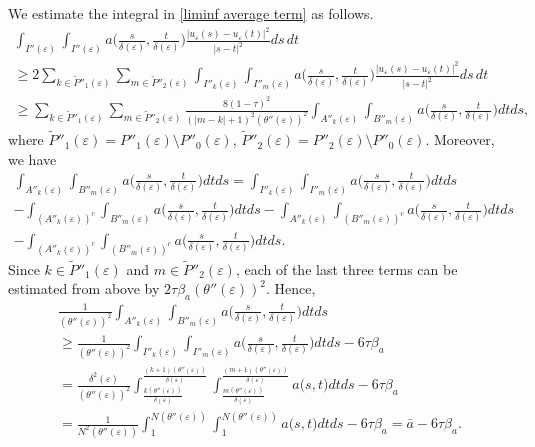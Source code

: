 \documentclass[12pt]{article}
\numberwithin{equation}{section}
\def\e{\varepsilon}
\begin{document}
 We estimate the integral in \eqref{liminf average term} as follows.
 \begin{multline*}    \int_{I''(\e)}\int_{I''(\e)}a\Big(\frac{s}{\delta(\e) },\frac{t}{\delta(\e) }\Big)\frac{\left|u_{\varepsilon}(s)-u_{\varepsilon}(t)\right|^2}{\left|s-t\right|^2}ds\,dt\\\ge2\sum_{k\in\widetilde{P}''_{1}(\varepsilon)}\sum_{m\in\widetilde{P}''_{2}(\varepsilon)}\int_{I''_{k}(\varepsilon)}\int_{I''_{m}(\varepsilon)}a\Big(\frac{s}{\delta(\e) },\frac{t}{\delta(\e) }\Big)\frac{\left|u_{\varepsilon}(s)-u_{\varepsilon}(t)\right|^2}{\left|s-t\right|^2}ds\,dt\\\ge\sum_{k\in\widetilde{P}''_{1}(\varepsilon)}\sum_{m\in\widetilde{P}''_{2}(\varepsilon)}\frac{8(1-\tau)^{2}}{(|m-k|+1)^{2}(\theta''(\e))^{2}}\int_{A''_{k}(\varepsilon)}\int_{B''_{m}(\varepsilon)}a\Big(\frac{s}{\delta(\varepsilon)},\frac{t}{\delta(\e)}\Big)dtds, 
 \end{multline*}
 where
$\widetilde{P}''_1(\varepsilon)=P''_{1}(\varepsilon)\setminus P''_{0}(\varepsilon)$, $\widetilde{P}''_{2}(\varepsilon)=P''_{2}(\varepsilon)\setminus P''_{0}(\varepsilon)$. Moreover, we have
\begin{multline*}
    \int_{A''_{k}(\varepsilon)}\int_{B''_{m}(\varepsilon)}a\Big(\frac{s}{\delta(\varepsilon)},\frac{t}{\delta(\varepsilon)}\Big)dtds=\int_{I''_{k}(\varepsilon)}\int_{I''_{m}(\varepsilon)}a\Big(\frac{s}{\delta(\varepsilon)},\frac{t}{\delta(\varepsilon)}\Big)dtds\\- \int_{(A''_{k}(\varepsilon))^{c}}\int_{B''_{m}(\varepsilon)}a\Big(\frac{s}{\delta(\varepsilon)},\frac{t}{\delta(\varepsilon)}\Big)dtds- \int_{A''_{k}(\varepsilon)}\int_{(B''_{m}(\varepsilon))^{c}}a\Big(\frac{s}{\delta(\varepsilon)},\frac{t}{\delta(\varepsilon)}\Big)dtds\\-\int_{(A''_{k}(\varepsilon))^{c}}\int_{(B''_{m}(\varepsilon))^{c}}a\Big(\frac{s}{\delta(\varepsilon)},\frac{t}{\delta(\varepsilon)}\Big)dtds.
\end{multline*}
Since \(k\in\widetilde{P}''_1(\varepsilon)\) and
\(m\in\widetilde{P}''_2(\varepsilon)\), each of the last three terms can be estimated from above by
\(2\tau\beta_a(\theta''(\varepsilon))^2\). Hence,
\begin{multline*}
    \frac{1}{(\theta''(\varepsilon))^{2}}\int_{A''_{k}(\varepsilon)}\int_{B''_{m}(\varepsilon)}a\Big(\frac{s}{\delta(\varepsilon)},\frac{t}{\delta(\varepsilon)}\Big)dtds
    \\
    \ge\frac{1}{(\theta''(\varepsilon))^{2}}\int_{I''_{k}(\varepsilon)}\int_{I''_{m}(\varepsilon)}a\Big(\frac{s}{\delta(\varepsilon)},\frac{t}{\delta(\varepsilon)}\Big)dtds-6\tau\beta_{a}
    \\
    =\frac{\delta^{2}(\varepsilon)}{(\theta''(\varepsilon))^{2}}\int_{\frac{k(\theta''(\varepsilon))}{\delta(\varepsilon)}}^{\frac{(k+1)(\theta''(\varepsilon))}{\delta(\varepsilon)}}\int_{\frac{m(\theta''(\varepsilon))}{\delta(\varepsilon)}}^{\frac{(m+1)(\theta''(\varepsilon))}{\delta(\varepsilon)}}a\Big(s,t\Big)dtds-6\tau\beta_{a}
    \\
    =\frac{1}{N^2(\theta''(\e))}\int_{1}^{N(\theta''(\e))}\int_{1}^{N(\theta''(\e))}a\Big(s,t\Big)dtds-6\tau\beta_{a}
    =\bar{a}-6\tau\beta_{a}.
\end{multline*} 
\end{document}
